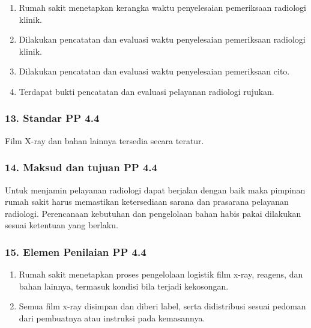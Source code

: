 \documentclass[
]{book}
\providecommand{\tightlist}{%
  \setlength{\itemsep}{0pt}\setlength{\parskip}{0pt}}
\begin{document}
\begin{enumerate}
\def\labelenumi{\alph{enumi}.}
\tightlist
\item
  Rumah sakit menetapkan kerangka waktu penyelesaian pemeriksaan radiologi klinik.
\item
  Dilakukan pencatatan dan evaluasi waktu penyelesaian pemeriksaan radiologi klinik.
\item
  Dilakukan pencatatan dan evaluasi waktu penyelesaian pemeriksaan cito.
\item
  Terdapat bukti pencatatan dan evaluasi pelayanan radiologi rujukan.
\end{enumerate}

\hypertarget{standar-pp-4.4}{%
\subsubsection*{13. Standar PP 4.4}\label{standar-pp-4.4}}

Film X-ray dan bahan lainnya tersedia secara teratur.

\hypertarget{maksud-dan-tujuan-pp-4.4}{%
\subsubsection*{14. Maksud dan tujuan PP 4.4}\label{maksud-dan-tujuan-pp-4.4}}

Untuk menjamin pelayanan radiologi dapat berjalan dengan baik maka pimpinan rumah sakit harus memastikan ketersediaan sarana dan prasarana pelayanan radiologi. Perencanaan kebutuhan dan pengelolaan bahan habis pakai dilakukan sesuai ketentuan yang berlaku.

\hypertarget{elemen-penilaian-pp-4.4}{%
\subsubsection*{15. Elemen Penilaian PP 4.4}\label{elemen-penilaian-pp-4.4}}

\begin{enumerate}
\def\labelenumi{\alph{enumi}.}
\tightlist
\item
  Rumah sakit menetapkan proses pengelolaan logistik film x-ray, reagens, dan bahan lainnya, termasuk kondisi bila terjadi kekosongan.
\item
  Semua film x-ray disimpan dan diberi label, serta didistribusi sesuai pedoman dari pembuatnya atau instruksi pada kemasannya.
\end{enumerate}
\end{document}
